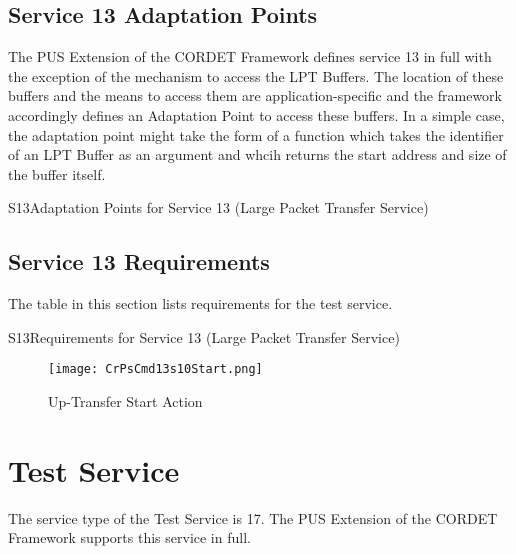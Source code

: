 \documentclass{pnp_article}
\begin{document}


\newpage
\subsection{Service 13 Adaptation Points}
The PUS Extension of the CORDET Framework defines service 13 in full with the exception of the mechanism to access the LPT Buffers. The location of these buffers and the means to access them are application-specific and the framework accordingly defines an Adaptation Point to access these buffers. In a simple case, the adaptation point might take the form of a function which takes the identifier of an LPT Buffer as an argument and whcih returns the start address and size of the buffer itself.

\begin{crAp}{S13}{Adaptation Points for Service 13 (Large Packet Transfer Service)}
\end{crAp}


\newpage
\subsection{Service 13 Requirements}
The table in this section lists requirements for the test service.

\begin{crReq}{S13}{Requirements for Service 13 (Large Packet Transfer Service)}
\end{crReq}

\begin{figure}[H]
 \centering
 \texttt{[image: CrPsCmd13s10Start.png]}
 \caption{Up-Transfer Start Action}
 \label{fig:Cmd13s10Start}
\end{figure}




\section{Test Service}\label{sec:serv17}
The service type of the Test Service is 17. The PUS Extension of the CORDET Framework supports this service in full.
\end{document}
